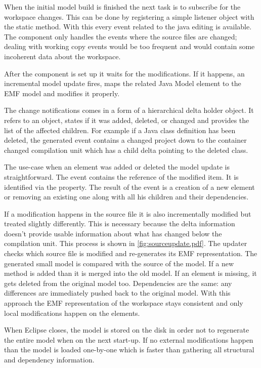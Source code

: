 When the initial model build is finished the next task is to subscribe for the
workspace changes. This can be done by registering a simple listener object with
the   static
method. With this every event related to the java editing is available. The
component only handles the events where the source files are changed; dealing
with working copy events would be too frequent and would contain some incoherent
data about the workspace. 
	
After the component is set up it waits for the modifications. If it happens, an
incremental model update fires, maps the related Java Model element to the EMF
model and modifies it properly. 

The change notifications comes in a form of a hierarchical delta holder object.
It refers to an object, states if it was added, deleted, or changed and provides
the list of the affected children. For example if a Java class definition has
been deleted, the generated event contains a changed project down to the
container changed compilation unit which has a child delta pointing to the
deleted class.

The use-case when an element was added or deleted the model update is
straightforward. The event contains the reference of the modified item. It is
identified via the  property. The result of the event is a
creation of a new element or removing an existing one along with all his
children and their dependencies.

If a modification happens in the source file it is also incrementally modified
but treated slightly differently. This is necessary because the delta
information doesn't provide usable information about what has changed below the
compilation unit.
This process is shown in \autoref{fig:sourceupdate.pdf}. The updater checks
which source file is modified and re-generates its EMF representation. The
generated small model is compared with the source of the model. If a new method
is added than it is merged into the old model. If an element is missing, it gets
deleted from the original model too. Dependencies are the same: any differences
are immediately pushed back to the original model. With this approach the EMF
representation of the workspace stays consistent and only local modifications
happen on the elements.

When Eclipse closes, the model is stored on the disk in order not to regenerate
the entire model when on the next start-up. If no external modifications happen
than the model is loaded one-by-one which is faster than gathering all
structural and dependency information.

